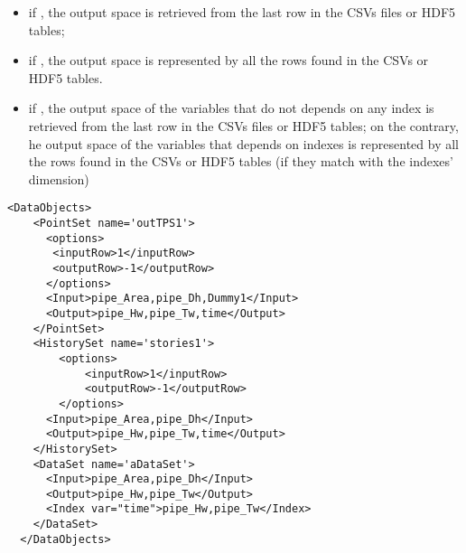 \begin{itemize}
\begin{itemize}
       \begin{itemize}
           \item if , the output space is retrieved from the last row in the CSVs files or HDF5 tables;
           \item if , the output space is represented by all the rows found in  the CSVs or HDF5 tables.
           \item if , the output space of the variables that do not depends on any index is retrieved from the last row in the CSVs files or HDF5 tables; 
           on the contrary, he output space of the variables that depends on indexes is represented by all the rows found in  the CSVs or HDF5 tables (if they match 
           with the indexes' dimension)
        \end{itemize}
    \end{itemize}
    
\end{itemize}

\begin{lstlisting}[style=XML,morekeywords={operator,hierarchical,name,var}]
  <DataObjects>
    <PointSet name='outTPS1'>
      <options>
       <inputRow>1</inputRow>
       <outputRow>-1</outputRow>
      </options>
      <Input>pipe_Area,pipe_Dh,Dummy1</Input>
      <Output>pipe_Hw,pipe_Tw,time</Output>
    </PointSet>
    <HistorySet name='stories1'>
        <options>
            <inputRow>1</inputRow>
            <outputRow>-1</outputRow>
        </options>
      <Input>pipe_Area,pipe_Dh</Input>
      <Output>pipe_Hw,pipe_Tw,time</Output>
    </HistorySet>
    <DataSet name='aDataSet'>
      <Input>pipe_Area,pipe_Dh</Input>
      <Output>pipe_Hw,pipe_Tw</Output>
      <Index var="time">pipe_Hw,pipe_Tw</Index>
    </DataSet>
  </DataObjects>
\end{lstlisting}

